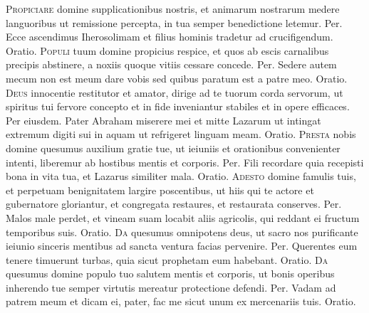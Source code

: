 \begin{multicols*}{2}
\lettrine[lines=2]{\zallmancaps \color{Blue} P}{ropiciare} domine supplicationibus nostris, et animarum nostrarum medere languoribus ut remissione percepta, in tua semper benedictione letemur. Per.
 Ecce ascendimus Iherosolimam et filius hominis tradetur ad crucifigendum. {\color{Red} Oratio.}
\lettrine[lines=2]{\zallmancaps \color{Red} P}{opuli} tuum domine propicius respice, et quos ab escis carnalibus precipis abstinere, a noxiis quoque vitiis cessare concede. Per.
 Sedere autem mecum non est meum dare vobis sed quibus paratum est a patre meo. {\color{Red} Oratio.}
\lettrine[lines=2]{\zallmancaps \color{Blue} D}{eus} innocentie restitutor et amator, dirige ad te tuorum corda servorum, ut spiritus tui fervore concepto et in fide inveniantur stabiles et in opere efficaces. Per eiusdem.
 Pater Abraham miserere mei et mitte Lazarum ut intingat extremum digiti sui in aquam ut refrigeret linguam meam. {\color{Red} Oratio.}
\lettrine[lines=2]{\zallmancaps \color{Red} P}{resta} nobis domine quesumus auxilium gratie tue, ut ieiuniis et orationibus convenienter intenti, liberemur ab hostibus mentis et corporis. Per.
 Fili recordare quia recepisti bona in vita tua, et Lazarus similiter mala. {\color{Red} Oratio.}
\lettrine[lines=2]{\zallmancaps \color{Blue} A}{desto} domine famulis tuis, et perpetuam benignitatem largire poscentibus, ut hiis qui te actore et gubernatore gloriantur, et congregata restaures, et restaurata conserves. Per.
 Malos male perdet, et vineam suam locabit aliis agricolis, qui reddant ei fructum temporibus suis. {\color{Red} Oratio.}
\lettrine[lines=2]{\zallmancaps \color{Red} D}{a} quesumus omnipotens deus, ut sacro nos purificante ieiunio sinceris mentibus ad sancta ventura facias pervenire. Per.
 Querentes eum tenere timuerunt turbas, quia sicut prophetam eum habebant. {\color{Red} Oratio.}
\lettrine[lines=2]{\zallmancaps \color{Blue} D}{a} quesumus domine populo tuo salutem mentis et corporis, ut bonis operibus inherendo tue semper virtutis mereatur protectione defendi. Per.
 Vadam ad patrem meum et dicam ei, pater, fac me sicut unum ex mercenariis tuis. {\color{Red} Oratio.}

\end{multicols*}
